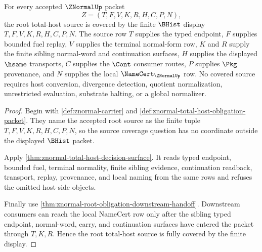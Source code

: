 \begin{theorem}
\label{thm:znormal-root-total-host-source-coverage}
For every accepted $\ZNormalUp$ packet
$$
Z=(T,F,V,K,R,H,C,P,N),
$$
the root total-host source is covered by the finite $\BHist$ display $T,F,V,K,R,H,C,P,N$. The source row $T$ supplies the typed endpoint, $F$ supplies bounded fuel replay, $V$ supplies the terminal normal-form row, $K$ and $R$ supply the finite sibling normal-word and continuation surfaces, $H$ supplies the displayed $\hsame$ transports, $C$ supplies the $\Cont$ consumer routes, $P$ supplies $\Pkg$ provenance, and $N$ supplies the local $\NameCert_{\ZNormalUp}$ row. No covered source requires host conversion, divergence detection, quotient normalization, unrestricted evaluation, substrate halting, or a global normalizer.
\end{theorem}
\begin{proof}
Begin with \autoref{def:znormal-carrier} and \autoref{def:znormal-total-host-obligation-packet}. They name the accepted root source as the finite tuple $T,F,V,K,R,H,C,P,N$, so the source coverage question has no coordinate outside the displayed $\BHist$ packet.

Apply \autoref{thm:znormal-total-host-decision-surface}. It reads typed endpoint, bounded fuel, terminal normality, finite sibling evidence, continuation readback, transport, replay, provenance, and local naming from the same rows and refuses the omitted host-side objects.

Finally use \autoref{thm:znormal-root-obligation-downstream-handoff}. Downstream consumers can reach the local NameCert row only after the sibling typed endpoint, normal-word, carry, and continuation surfaces have entered the packet through $T,K,R$. Hence the root total-host source is fully covered by the finite display.
\end{proof}

